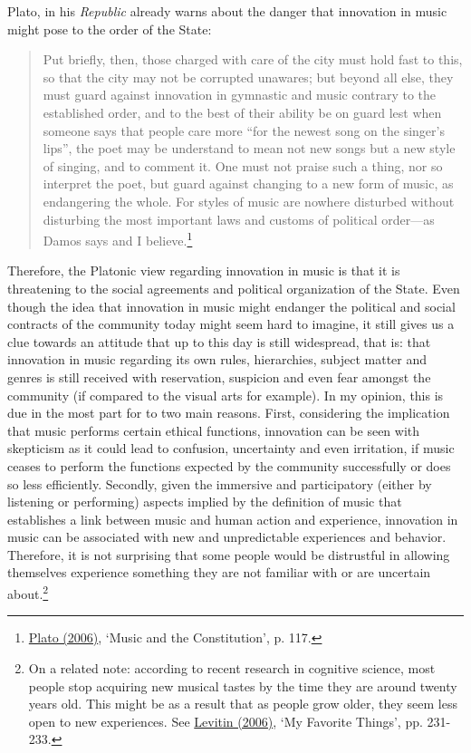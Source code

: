 Plato, in his \emph{Republic} already warns about the danger that innovation in music might pose to the order of the State:
\begin{quote}
Put briefly, then, those charged with care of the city must hold fast to this, so that the city may not be corrupted unawares; but beyond all else, they must guard against innovation in gymnastic and music contrary to the established order, and to the best of their ability be on guard lest when someone says that people care more ``for the newest song on the singer's lips'', the poet may be understand to mean not new songs but a new style of singing, and to comment it. One must not praise such a thing, nor so interpret the poet, but guard against changing to a new form of music, as endangering the whole. For styles of music are nowhere disturbed without disturbing the most important laws and customs of political order---as Damos says and I believe.\footnote{\hyperlink{plato}{Plato (2006)}, `Music and the Constitution', p. 117.}
\end{quote}
Therefore, the Platonic view regarding innovation in music is that it is threatening to the social agreements and political organization of the State. Even though the idea that innovation in music might endanger the political and social contracts of the community today might seem hard to imagine, it still gives us a clue towards an attitude that up to this day is still widespread, that is: that innovation in music regarding its own rules, hierarchies, subject matter and genres is still received with reservation, suspicion and even fear amongst the community (if compared to the visual arts for example). In my opinion, this is due in the most part for to two main reasons. First, considering the implication that music performs certain ethical functions, innovation can be seen with skepticism as it could lead to confusion, uncertainty and even irritation, if music ceases to perform the functions expected by the community successfully or does so less efficiently. Secondly, given the immersive and participatory (either by listening or performing) aspects implied by the definition of music that establishes a link between music and human action and experience, innovation in music can be associated with new and unpredictable experiences and behavior. Therefore, it is not surprising that some people would be distrustful in allowing themselves experience something they are not familiar with or are uncertain about.\footnote{On a related note: according to recent research in cognitive science, most people stop acquiring new musical tastes by the time they are around twenty years old. This might be as a result that as people grow older, they seem less open to new experiences. See \hyperlink{musmind}{Levitin (2006)}, `My Favorite Things', pp. 231-233.}

